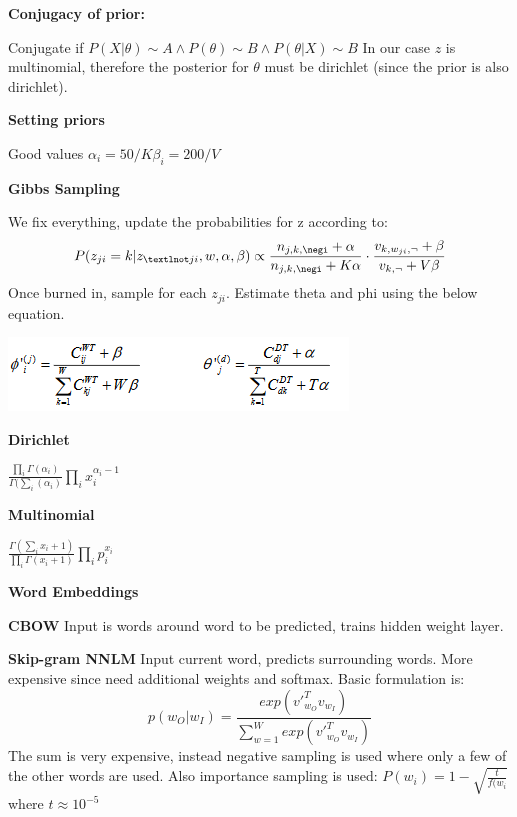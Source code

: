 \documentclass[a4paper,10pt,landscape]{article}
\begin{document}
\begin{multicols}{3}
\textbf{Conjugacy of prior:}

Conjugate if $P(X|\theta) \sim A \land P(\theta) \sim B \land P(\theta|X)\sim B$
In our case $z$  is multinomial, therefore the posterior for $\theta$ must be dirichlet (since the prior is also dirichlet).

\textbf{Setting priors}

Good values $\alpha_i = 50/K \beta_i=200/V$

\textbf{Gibbs Sampling}

We fix everything, update the probabilities for z according to:
\begin{equation*}
    P(z_{ji}=k|z_{¬ji},w,\alpha,\beta)\propto \frac{n_{j,k,\negi}+\alpha}{n_{j,k,\negi}+K\alpha}\cdot\frac{v_{k,w_{ji},\neg}+\beta}{v_{k,\neg}+V\beta}
\end{equation*}
Once burned in, sample for each $z_{ji}$. Estimate theta and phi using the below equation.

\includegraphics[width=\linewidth]{images/thetaphi.png}

\textbf{Dirichlet}

$\frac{\prod_i \Gamma(\alpha_i)}{ \Gamma(\sum_i(\alpha_i)}\prod_ix_i^{\alpha_i-1}$

\textbf{Multinomial}

$\frac{\Gamma(\sum_ix_i+1)}{\prod_i\Gamma(x_i+1)}\prod_ip_i^{x_i}$

\begin{center}
{\Large \textbf{Word Embeddings} \par}
\end{center}

\textbf{CBOW}
Input is words around word to be predicted, trains hidden weight layer.

\textbf{Skip-gram NNLM}
Input current word, predicts surrounding words.
More expensive since need additional weights and softmax.
Basic formulation is:
\begin{equation*}
    p(w_O|w_I) = \frac{exp(v'_{w_O}^Tv_{w_I})}{\sum_{w=1}^{W}exp(v'_{w_O}^Tv_{w_I})}
\end{equation*}
The sum is very expensive, instead negative sampling is used where only a few of the other words are used. Also importance sampling is used: $P(w_i)=1-\sqrt{\frac{t}{f(w_i}}$ where $t\approx10^{-5}$
\vspace{18mm} 
\begin{center}


\end{center}
\end{multicols}
\end{document}

